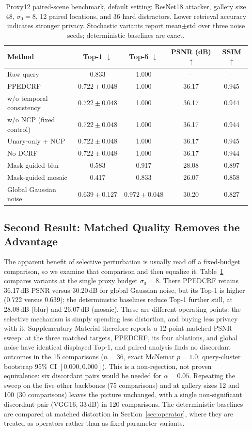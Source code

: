 \documentclass[10pt,journal]{IEEEtran}
\begin{document}
\begin{table}[t]
\centering
\caption{Proxy12 paired-scene benchmark, default setting: ResNet18 attacker, gallery size 48, $\sigma_0=8$, 12 paired locations, and 36 hard distractors. Lower retrieval accuracy indicates stronger privacy. Stochastic variants report mean$\pm$std over three noise seeds; deterministic baselines are exact.}
\label{tab:ablation}
\begin{tabular}{lcccc}
\hline
Method & Top-1 $\downarrow$ & Top-5 $\downarrow$ & PSNR (dB) $\uparrow$ & SSIM $\uparrow$ \\
\hline
Raw query & 0.833 & 1.000 & -- & -- \\
PPEDCRF & $0.722\pm0.048$ & 1.000 & 36.17 & 0.945 \\
w/o temporal consistency & $0.722\pm0.048$ & 1.000 & 36.17 & 0.944 \\
w/o NCP (fixed control) & $0.722\pm0.048$ & 1.000 & 36.17 & 0.944 \\
Unary-only + NCP & $0.722\pm0.048$ & 1.000 & 36.17 & 0.945 \\
No DCRF & $0.722\pm0.048$ & 1.000 & 36.17 & 0.944 \\
Mask-guided blur & 0.583 & 0.917 & 28.08 & 0.897 \\
Mask-guided mosaic & 0.417 & 0.833 & 26.07 & 0.858 \\
Global Gaussian noise & $0.639\pm0.127$ & $0.972\pm0.048$ & 30.20 & 0.827 \\
\hline
\end{tabular}
\end{table}

\subsection{Second Result: Matched Quality Removes the Advantage}
\label{sec:matched}
The apparent benefit of selective perturbation is usually read off a
fixed-budget comparison, so we examine that comparison and then equalize it.
Table~\ref{tab:ablation} compares variants at the single proxy budget $\sigma_0=8$. There PPEDCRF retains 36.17\,dB PSNR versus 30.20\,dB for global Gaussian noise, but its Top-1 is higher (0.722 versus 0.639); the deterministic baselines reduce Top-1 further still, at 28.08\,dB (blur) and 26.07\,dB (mosaic). These are different operating points: the selective mechanism is simply spending less distortion, and buying less privacy with it. Supplementary Material therefore reports a 12-point matched-PSNR sweep: at the three matched targets, PPEDCRF, its four ablations, and global noise have identical displayed Top-1, and paired analysis finds no discordant outcomes in the 15 comparisons ($n=36$, exact McNemar $p=1.0$, query-cluster bootstrap 95\% CI $[0.000,0.000]$). This is a non-rejection, not proven equivalence: six discordant pairs would be needed for $\alpha=0.05$. Repeating the sweep on the five other backbones (75 comparisons) and at gallery sizes 12 and 100 (30 comparisons) leaves the picture unchanged, with a single non-significant discordant pair (VGG16, 33\,dB) in 120 comparisons. The deterministic baselines are compared at matched distortion in
Section~\ref{sec:operator}, where they are treated as operators rather than as
fixed-parameter variants.
\end{document}
